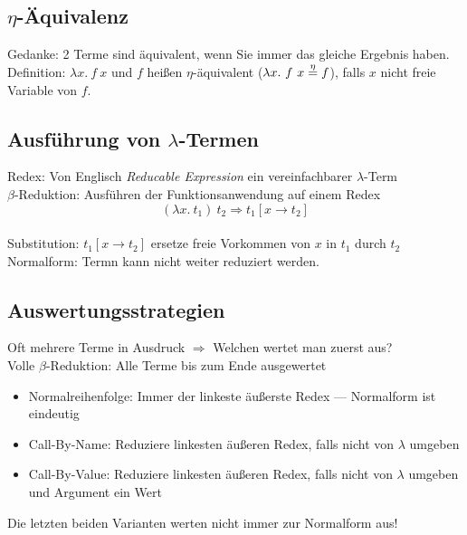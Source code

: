 \subsection{\(\eta\)-Äquivalenz}%
\label{tg:sub:eta-aequivalenz}
Gedanke: 2 Terme sind äquivalent, wenn Sie immer das gleiche Ergebnis haben.\\
Definition: \(\lambda x.\ f\ x\) und \(f\) heißen \(\eta\)-äquivalent (\(\lambda x.\ f\ x \overset{\eta}{=} f\)), falls \(x\)
nicht freie Variable von \(f\).

\subsection{Ausführung von \(\lambda\)-Termen}%
\label{tg:sub:ausfuehrung-von-lambda-termen}
Redex: Von Englisch \textit{Reducable Expression} ein vereinfachbarer \(\lambda\)-Term\\
\(\beta\)-Reduktion: Ausführen der Funktionsanwendung auf einem Redex \[(\lambda x.\ t_1)\ t_2 \Rightarrow t_1 [x \rightarrow t_2]\]\\
Substitution: \(t_1 [x \rightarrow t_2]\) ersetze freie Vorkommen von \(x\) in \(t_1\) durch \(t_2\)\\
Normalform: Termn kann nicht weiter reduziert werden.

\newpage
\subsection{Auswertungsstrategien}%
\label{tg:sub:auswertungsstrategien}
Oft mehrere Terme in Ausdruck \(\Rightarrow\) Welchen wertet man zuerst aus?\\
Volle \(\beta\)-Reduktion: Alle Terme bis zum Ende ausgewertet
\begin{itemize}
  \item Normalreihenfolge: Immer der linkeste äußerste Redex --- Normalform ist eindeutig
  \item Call-By-Name: Reduziere linkesten äußeren Redex, falls nicht von \(\lambda\) umgeben
  \item Call-By-Value: Reduziere linkesten äußeren Redex, falls nicht von \(\lambda\) umgeben und Argument ein Wert
\end{itemize}
Die letzten beiden Varianten werten nicht immer zur Normalform aus!

